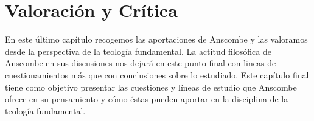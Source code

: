 \documentclass[../main.tex]{subfiles}
\begin{document}
\chapter{Valoración y Crítica}

En este último capítulo recogemos las aportaciones de Anscombe y las valoramos desde la perspectiva de la teología fundamental. La actitud filosófica de Anscombe en sus discusiones nos dejará en este punto final con lineas de cuestionamientos más que con conclusiones sobre lo estudiado. Este capítulo final tiene como objetivo presentar las cuestiones y líneas de estudio que Anscombe ofrece en su pensamiento y cómo éstas pueden aportar en la disciplina de la teología fundamental.
\end{document}
